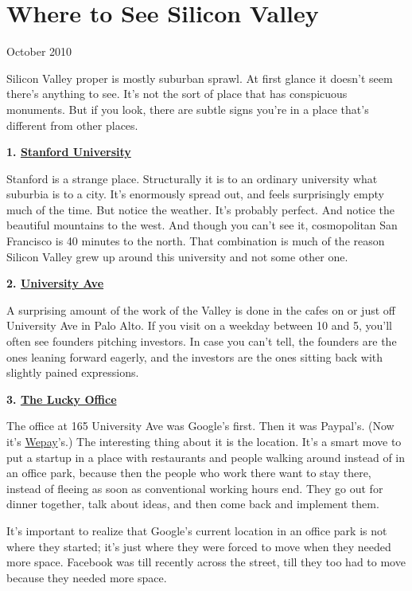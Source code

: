 \chapter{Where to See Silicon Valley}

October 2010

Silicon Valley proper is mostly suburban sprawl. At first glance it
doesn't seem there's anything to see. It's not the sort of place that
has conspicuous monuments. But if you look, there are subtle signs
you're in a place that's different from other places.

\textbf{1.
\href{http://maps.google.com/maps?q=stanford+university}{Stanford
University}}

Stanford is a strange place. Structurally it is to an ordinary
university what suburbia is to a city. It's enormously spread out, and
feels surprisingly empty much of the time. But notice the weather. It's
probably perfect. And notice the beautiful mountains to the west. And
though you can't see it, cosmopolitan San Francisco is 40 minutes to the
north. That combination is much of the reason Silicon Valley grew up
around this university and not some other one.

\textbf{2.
\href{http://maps.google.com/maps?q=university+and+ramona+palo+alto}{University
Ave}}

A surprising amount of the work of the Valley is done in the cafes on or
just off University Ave in Palo Alto. If you visit on a weekday between
10 and 5, you'll often see founders pitching investors. In case you
can't tell, the founders are the ones leaning forward eagerly, and the
investors are the ones sitting back with slightly pained expressions.

\textbf{3.
\href{http://maps.google.com/maps?q=165+university+ave+palo+alto}{The
Lucky Office}}

The office at 165 University Ave was Google's first. Then it was
Paypal's. (Now it's \href{http://wepay.com}{Wepay}'s.) The interesting
thing about it is the location. It's a smart move to put a startup in a
place with restaurants and people walking around instead of in an office
park, because then the people who work there want to stay there, instead
of fleeing as soon as conventional working hours end. They go out for
dinner together, talk about ideas, and then come back and implement
them.

It's important to realize that Google's current location in an office
park is not where they started; it's just where they were forced to move
when they needed more space. Facebook was till recently across the
street, till they too had to move because they needed more space.

